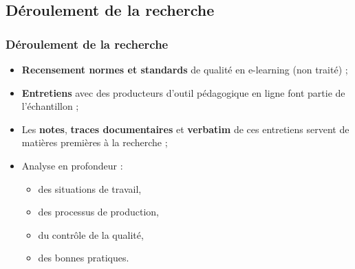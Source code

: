                        	\subsection{Déroulement de la recherche} 
					\begin{frame}[allowframebreaks]
						\frametitle{Déroulement de la recherche}
                        
                        			\begin{itemize} 
                       				 \item \textbf{Recensement normes et standards} de qualité en e-learning (non traité) ;
                       				 \item \textbf{Entretiens} avec des producteurs d’outil pédagogique en ligne font partie de l’échantillon ; 
                       				 \item Les \textbf{notes}, \textbf{traces documentaires} et \textbf{verbatim} de ces entretiens servent de matières premières à la recherche  ;
                       				 \item Analyse en profondeur :
                       				 \begin{itemize} 
                       				 	\item des situations de travail, 
                       				 	\item des processus de production,
                       				 	\item du contrôle de la qualité,
                       				 	\item des bonnes pratiques.
                       				 \end{itemize}
                       		 \end{itemize}

             
                \end{frame}
